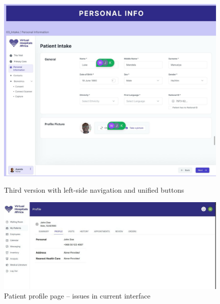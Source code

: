 \begin{figure}[H]
    \centering
    \begin{minipage}{0.47\textwidth}
        \centering
        \includegraphics[width=\textwidth]{images/(VHA)-3.jpg}
        \caption{Third version with left-side navigation and unified buttons}
        \label{fig:design-3}
    \end{minipage}\hfill
    \begin{minipage}{0.47\textwidth}
        \centering
        \includegraphics[width=\textwidth]{images/(VHA)-4.jpg}
        \caption{Patient profile page – issues in current interface}
        \label{fig:design-4}
    \end{minipage}
\end{figure}
